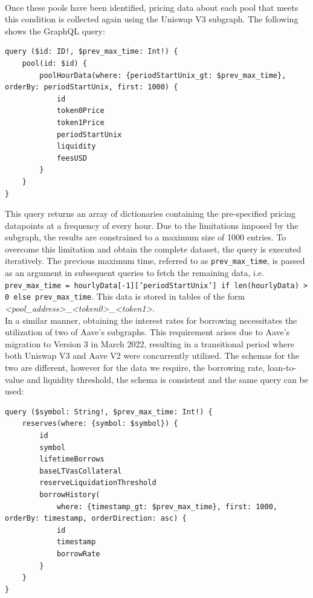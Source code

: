 \\[5mm]
Once these pools have been identified, pricing data about each pool that meets this condition is collected again using the Uniswap V3 subgraph. The following shows the GraphQL query:
\vspace{5mm}
\begin{lstlisting}
query ($id: ID!, $prev_max_time: Int!) {
    pool(id: $id) {
        poolHourData(where: {periodStartUnix_gt: $prev_max_time}, orderBy: periodStartUnix, first: 1000) {
            id
            token0Price
            token1Price
            periodStartUnix
            liquidity
            feesUSD
        }
    }
}
\end{lstlisting}
\vspace{5mm}
This query returns an array of dictionaries containing the pre-specified pricing datapoints at a frequency of every hour. Due to the limitations imposed by the subgraph, the results are constrained to a maximum size of 1000 entries. To overcome this limitation and obtain the complete dataset, the query is executed iteratively. The previous maximum time, referred to as \texttt{prev\_max\_time}, is passed as an argument in subsequent queries to fetch the remaining data, i.e. \texttt{prev\_max\_time = hourlyData[-1]['periodStartUnix'] if len(hourlyData) > 0 else prev\_max\_time}. This data is stored in tables of the form \textit{<pool\_address>}\_\textit{<token0>}\_\textit{<token1>}.
\\[5mm]
In a similar manner, obtaining the interest rates for borrowing necessitates the utilization of two of Aave's subgraphs. This requirement arises due to Aave's migration to Version 3 in March 2022, resulting in a transitional period where both Uniswap V3 and Aave V2 were concurrently utilized. The schemas for the two are different, however for the data we require, the borrowing rate, loan-to-value and liquidity threshold, the schema is consistent and the same query can be used:
\vspace{5mm}
\begin{lstlisting}
query ($symbol: String!, $prev_max_time: Int!) {
    reserves(where: {symbol: $symbol}) {
        id
        symbol
        lifetimeBorrows
        baseLTVasCollateral
        reserveLiquidationThreshold
        borrowHistory(
            where: {timestamp_gt: $prev_max_time}, first: 1000, orderBy: timestamp, orderDirection: asc) {
            id
            timestamp
            borrowRate
        }
    }
}
\end{lstlisting}
\vspace{5mm}
